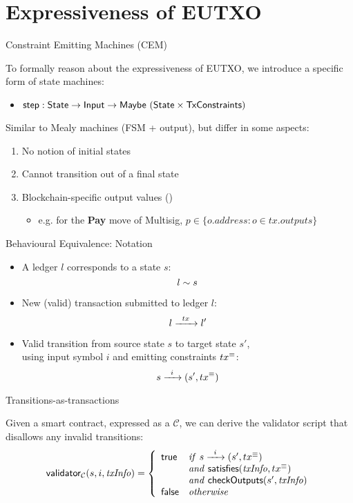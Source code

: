 \section{Expressiveness of EUTXO}

\begin{frame}{Constraint Emitting Machines (CEM)}

To formally reason about the expressiveness of EUTXO, we introduce a specific form of state machines:
\begin{itemize}
\item \textbf{$\textsf{step} : \textsf{State} \rightarrow \textsf{Input} \rightarrow \textsf{Maybe}\ (\textsf{State} \times \textsf{TxConstraints})$}
\end{itemize}

Similar to Mealy machines (FSM + output), but differ in some aspects:
\begin{enumerate}
\item No notion of initial states
\item Cannot transition out of a final state
\item Blockchain-specific output values ()
  \begin{itemize}
  \item e.g. for the \textbf{Pay} move of Multisig, $p \in \{ o.address : o \in tx.outputs \}$
  \end{itemize}
\end{enumerate}

\end{frame}

\begin{frame}{Behavioural Equivalence: Notation}

\begin{itemize}
\item A ledger $l$ corresponds to a \CEM{} state $s$:
\[
 l \sim s 
\]
\item New (valid) transaction submitted to ledger $l$:
\[
 l \xrightarrow{\hspace{5pt} tx \hspace{5pt}} l' 
\]
\item Valid \CEM{} transition from source state $s$ to target state $s'$,\\
using input symbol $i$ and emitting constraints $tx^\equiv$:
\[
 s \xrightarrow{\hspace{5pt} i \hspace{5pt}} (s' , tx^\equiv) 
\]
\end{itemize}

\end{frame}

\begin{frame}{Transitions-as-transactions}

Given a smart contract, expressed as a \CEM{} $\mathcal{C}$,
we can derive the validator script that disallows any invalid transitions:
\[
\mathsf{validator}_\mathcal{C}(s, i, \mathit{txInfo}) = \left\{
  \begin{array}{lll}
  \textsf{true}  & \mathit{if} \  s \xrightarrow{\hspace{5pt} i \hspace{5pt}} (s' , tx^\equiv)  \\
         & \mathit{and} \ \mathsf{satisfies}(\mathit{txInfo}, tx^\equiv) \\
         & \mathit{and} \ \mathsf{checkOutputs}(s', \mathit{txInfo}) \\
  \textsf{false} & \mathit{otherwise}
  \end{array}
\right.
\]

\end{frame}


